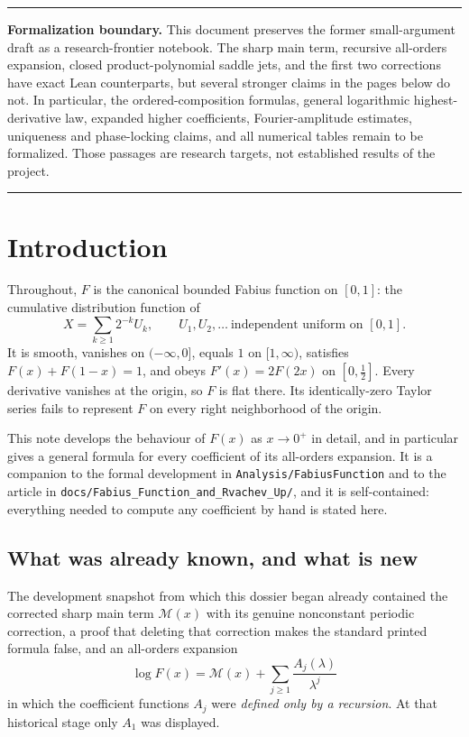 \documentclass[11pt,oneside]{article}
\theoremstyle{definition}
\theoremstyle{remark}
\newcommand{\repo}{\nolinkurl{Analysis/FabiusFunction}}
\newenvironment{boxedremark}{%
  \par\smallskip\noindent\begin{center}\begin{minipage}{0.94\textwidth}%
  \color{black}\hrule\vspace{0.6em}\small
}{%
  \vspace{0.6em}\hrule\end{minipage}\end{center}\smallskip
}
\begin{document}
\begin{boxedremark}
\textbf{Formalization boundary.}
This document preserves the former small-argument draft as a research-frontier notebook.
The sharp main term, recursive all-orders expansion, closed product-polynomial saddle jets,
and the first two corrections have exact Lean counterparts, but several stronger claims in
the pages below do not.  In particular, the ordered-composition formulas, general
logarithmic highest-derivative law,
expanded higher coefficients, Fourier-amplitude estimates, uniqueness and phase-locking
claims, and all numerical tables remain to be formalized.  Those passages are research
targets, not established results of the project.
\end{boxedremark}

\section{Introduction}

Throughout, $F$ is the canonical bounded Fabius function on $[0,1]$: the
cumulative distribution function of
\[
  X=\sum_{k\ge1}2^{-k}U_k,\qquad U_1,U_2,\dots\ \text{independent uniform on }[0,1].
\]
It is smooth, vanishes on $(-\infty,0]$, equals $1$ on $[1,\infty)$, satisfies
$F(x)+F(1-x)=1$, and obeys $F'(x)=2F(2x)$ on $[0,\tfrac12]$.  Every derivative
vanishes at the origin, so $F$ is flat there.  Its identically-zero Taylor series fails to
represent \(F\) on every right neighborhood of the origin.

This note develops the behaviour of $F(x)$ as $x\to0^+$ in detail, and in
particular gives a general formula for every coefficient of its all-orders
expansion.  It is a companion to the formal development in \repo{} and to the
article in \nolinkurl{docs/Fabius_Function_and_Rvachev_Up/}, and it is
self-contained: everything needed to compute any coefficient by hand is stated
here.

\subsection{What was already known, and what is new}

The development snapshot from which this dossier began already contained the corrected sharp main term
$\mathcal M(x)$ with its genuine nonconstant periodic correction, a proof that
deleting that correction makes the standard printed formula false, and an
all-orders expansion
\[
  \log F(x)=\mathcal M(x)+\sum_{j\ge1}\frac{A_j(\lambda)}{\lambda^j}
\]
in which the coefficient functions $A_j$ were \emph{defined only by a
recursion}.  At that historical stage only $A_1$ was displayed.
\end{document}
